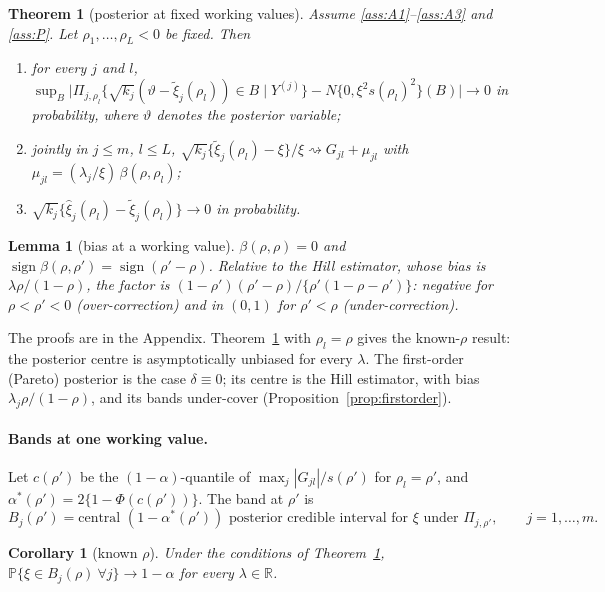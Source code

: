 \documentclass[11pt]{article}
\newtheorem{theorem}{Theorem}
\newtheorem{lemma}{Lemma}
\newtheorem{corollary}{Corollary}
\theoremstyle{definition}
\theoremstyle{remark}
\numberwithin{equation}{section}
\newcommand{\R}{\mathbb{R}}
\newcommand{\Prob}{\mathbb{P}}
\newcommand{\dto}{\rightsquigarrow}
\begin{document}
\begin{theorem}[posterior at fixed working values]\label{thm:bvm}
Assume \ref{ass:A1}--\ref{ass:A3} and \ref{ass:P}. Let $\rho_1,\dots,\rho_L<0$ be fixed. Then
\begin{enumerate}
\item[(i)] for every $j$ and $l$, $\sup_B\bigl|\Pi_{j,\rho_l}\{\sqrt{k_j}(\vartheta-\tilde\xi_j(\rho_l))\in B\mid Y^{(j)}\}-N\{0,\xi^2s(\rho_l)^2\}(B)\bigr|\to0$ in probability, where $\vartheta$ denotes the posterior variable;
\item[(ii)] jointly in $j\le m$, $l\le L$, $\sqrt{k_j}\{\tilde\xi_j(\rho_l)-\xi\}/\xi\dto G_{jl}+\mu_{jl}$ with $\mu_{jl}=(\lambda_j/\xi)\,\beta(\rho,\rho_l)$;
\item[(iii)] $\sqrt{k_j}\{\hat\xi_j(\rho_l)-\tilde\xi_j(\rho_l)\}\to0$ in probability.
\end{enumerate}
\end{theorem}

\begin{lemma}[bias at a working value]\label{lem:beta}
$\beta(\rho,\rho)=0$ and $\operatorname{sign}\beta(\rho,\rho')=\operatorname{sign}(\rho'-\rho)$. Relative to the Hill estimator, whose bias is $\lambda\rho/(1-\rho)$, the factor is $(1-\rho')(\rho'-\rho)/\{\rho'(1-\rho-\rho')\}$: negative for $\rho<\rho'<0$ (over-correction) and in $(0,1)$ for $\rho'<\rho$ (under-correction).
\end{lemma}

The proofs are in the Appendix. Theorem~\ref{thm:bvm} with $\rho_l=\rho$ gives the known-$\rho$ result: the posterior centre is asymptotically unbiased for every $\lambda$. The first-order (Pareto) posterior is the case $\delta\equiv0$; its centre is the Hill estimator, with bias $\lambda_j\rho/(1-\rho)$, and its bands under-cover (Proposition~\ref{prop:firstorder}).

\paragraph{Bands at one working value.} Let $c(\rho')$ be the $(1-\alpha)$-quantile of $\max_j|G_{jl}|/s(\rho')$ for $\rho_l=\rho'$, and $\alpha^*(\rho')=2\{1-\Phi(c(\rho'))\}$. The band at $\rho'$ is
\[
B_j(\rho')=\text{central }(1-\alpha^*(\rho'))\text{ posterior credible interval for }\xi\text{ under }\Pi_{j,\rho'},\qquad j=1,\dots,m.
\]

\begin{corollary}[known $\rho$]\label{cor:known}
Under the conditions of Theorem~\ref{thm:bvm}, $\Prob\{\xi\in B_j(\rho)\ \forall j\}\to1-\alpha$ for every $\lambda\in\R$.
\end{corollary}
\end{document}
